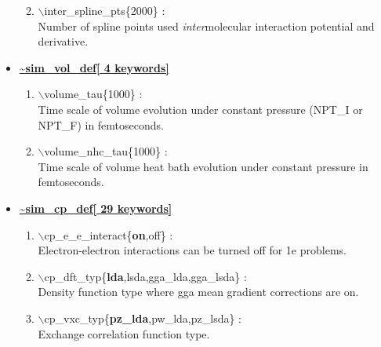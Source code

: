 \begin{itemize}
\begin{enumerate}
 \vspace{0.15in} \Large
 \item   $\backslash$inter\_spline\_pts\{2000\} : \\
   \large
    Number of spline points used {\it inter}molecular interaction 
    potential and derivative.

\end{enumerate}


\clearpage
\huge
\item[] \underline{\bf \~{}sim\_vol\_def[ 4 keywords]}
\begin{enumerate}

 \vspace{0.15in} \Large
 \item  $\backslash$volume\_tau\{1000\} : \\
    \large
     Time scale of volume evolution
     under constant pressure (NPT\_I or NPT\_F) in femtoseconds.
  
 \vspace{0.15in} \Large
 \item  $\backslash$volume\_nhc\_tau\{1000\} : \\
    \large
     Time scale of volume 
     heat bath evolution under constant pressure in femtoseconds.

\end{enumerate}

\clearpage
\huge
\item[] \underline{\bf \~{}sim\_cp\_def[ 29 keywords]}
\begin{enumerate}

 \vspace{0.15in} \Large
 \item  $\backslash$cp\_e\_e\_interact\{{\bf on},off\} : \\
    \large
     Electron-electron interactions can be turned off for 1e problems.

 \vspace{0.15in} \Large
 \item  $\backslash$cp\_dft\_typ\{{\bf lda},lsda,gga\_lda,gga\_lsda\} : \\
    \large
     Density function type where gga mean gradient corrections are on.

 \vspace{0.15in} \Large
 \item  $\backslash$cp\_vxc\_typ\{{\bf pz\_lda},pw\_lda,pz\_lsda\} : \\
    \large
     Exchange correlation function type.


\end{enumerate}
\end{itemize}
